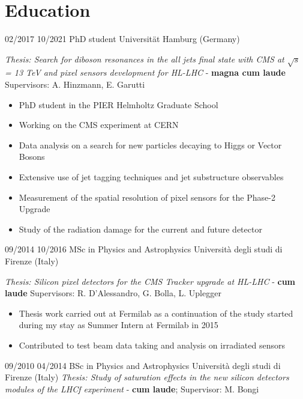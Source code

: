   \section{Education}
    \position
      {02/2017 \textemdash{} 10/2021}
      {PhD student}
      {Universit\"{a}t Hamburg (Germany)}
      {\textit{Thesis: Search for diboson resonances in the all jets final state with CMS at $\sqrt{s}$ = 13 TeV and pixel sensors development for HL-LHC} - {\bf magna cum laude}  \newline  Supervisors: A. Hinzmann, E. Garutti 
      \begin{itemize}
\item PhD student in the PIER Helmholtz Graduate School
\item  Working on the CMS experiment at CERN
\item Data analysis on a search for new particles decaying to Higgs or Vector Bosons
\item Extensive use of jet tagging techniques and jet substructure observables
\item Measurement of the spatial resolution of pixel sensors for the Phase-2 Upgrade
\item Study of the radiation damage for the current and future detector
\end{itemize}}
  \position
      {09/2014 \textemdash{} 10/2016}
      {MSc in Physics and Astrophysics}
      {Universit\`a degli studi di Firenze (Italy)}
      {\textit{Thesis: Silicon pixel detectors for the CMS Tracker upgrade at HL-LHC} - {\bf cum laude} \newline Supervisors: R. D'Alessandro, G. Bolla, L. Uplegger  
            \begin{itemize}
\item Thesis work carried out at Fermilab as a continuation of the study started during my stay as Summer Intern at Fermilab in 2015
\item Contributed to  test beam data taking and analysis on irradiated sensors
\end{itemize}
 }
        \position
      {09/2010 \textemdash{} 04/2014}
      {BSc in Physics and Astrophysics}
      {Universit\`a degli studi di Firenze (Italy)}
      {\textit{Thesis:  Study of saturation effects in the new silicon detectors modules of the LHCf experiment} - {\bf cum laude}; Supervisor: M. Bongi }      
\fi
